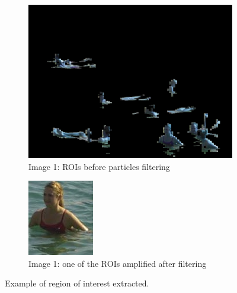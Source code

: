 \begin{figure}[h]
        \centering
        \begin{subfigure}[h]{0.3\textwidth}
                \includegraphics[width=\textwidth]{Images/proc}
                \caption{Image 1: ROIs before particles filtering}
        \end{subfigure}%
        \quad
        \begin{subfigure}[h]{0.3\textwidth}
                \includegraphics[width=\textwidth]{Images/ROI}
                \caption{Image 1: one of the ROIs amplified after filtering}
        \end{subfigure}
        \caption{Example of region of interest extracted.}
         \label{fig:ROIs}
\end{figure}


